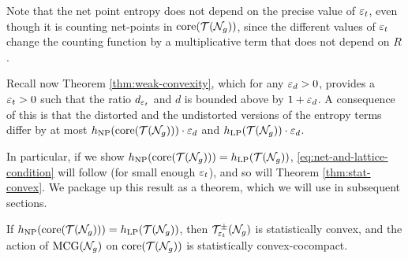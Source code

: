 Note that the net point entropy does not depend on the precise value of $\varepsilon_t$, even though it is counting net-points in $\mathrm{core}(\mathcal{T}(\mathcal{N}_g))$, since the different values of $\varepsilon_t$ change the counting function by a multiplicative term that does not depend on $R$.

Recall now Theorem \ref{thm:weak-convexity}, which for any $\varepsilon_d > 0$, provides a $\varepsilon_t > 0$ such that the ratio $d_{\varepsilon_t}$ and $d$ is bounded above by $1 + \varepsilon_d$.
A consequence of this is that the distorted and the undistorted versions of the entropy terms differ by at most $h_{\mathrm{NP}}(\mathrm{core}(\mathcal{T}(\mathcal{N}_g))) \cdot \varepsilon_d$ and $h_{\mathrm{LP}}(\mathcal{T}(\mathcal{N}_g)) \cdot \varepsilon_d$.

In particular, if we show $h_{\mathrm{NP}}(\mathrm{core}(\mathcal{T}(\mathcal{N}_g))) = h_{\mathrm{LP}}(\mathcal{T}(\mathcal{N}_g))$, \eqref{eq:net-and-lattice-condition} will follow (for small enough $\varepsilon_t$), and so will Theorem \ref{thm:stat-convex}.
We package up this result as a theorem, which we will use in subsequent sections.

\begin{theorem}
  \label{thm:entropy-equality-implies-scc}
  If $h_{\mathrm{NP}}(\mathrm{core}(\mathcal{T}(\mathcal{N}_g))) = h_{\mathrm{LP}}(\mathcal{T}(\mathcal{N}_g))$, then $\mathcal{T}_{\varepsilon_t}^{\pm}(\mathcal{N}_g)$ is statistically convex, and the action of $\mathrm{MCG}(\mathcal{N}_g)$ on $\mathrm{core}(\mathcal{T}(\mathcal{N}_g))$ is statistically convex-cocompact.
\end{theorem}


